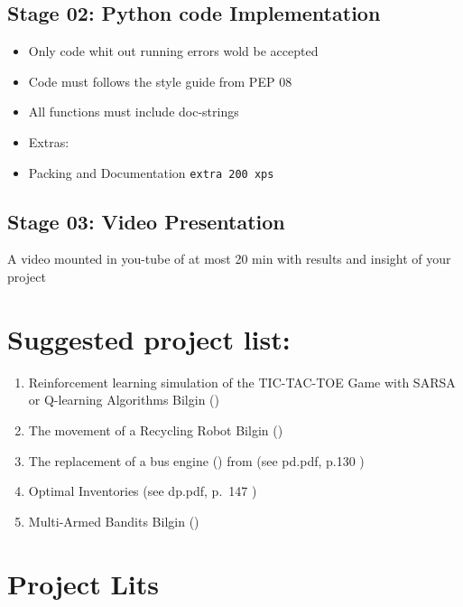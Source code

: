 \documentclass[
  letterpaper,
]{krantz}
\providecommand{\tightlist}{%
  \setlength{\itemsep}{0pt}\setlength{\parskip}{0pt}}\usepackage{longtable,booktabs,array}
\theoremstyle{plain}
\theoremstyle{definition}
\theoremstyle{definition}
\theoremstyle{remark}
\begin{document}
\subsection{Stage 02: Python code
Implementation}\label{stage-02-python-code-implementation}

\begin{itemize}
\tightlist
\item
  Only code whit out running errors wold be accepted
\item
  Code must follows the style guide from PEP 08
\item
  All functions must include doc-strings
\item
  Extras:
\item
  Packing and Documentation \texttt{extra\ 200\ xps}
\end{itemize}

\subsection{Stage 03: Video
Presentation}\label{stage-03-video-presentation}

A video mounted in you-tube of at most 20 min with results and insight
of your project

\section{Suggested project list:}\label{suggested-project-list}

\begin{enumerate}
\def\labelenumi{\arabic{enumi}.}
\tightlist
\item
  Reinforcement learning simulation of the TIC-TAC-TOE Game with SARSA
  or Q-learning Algorithms Bilgin ()
\item
  The movement of a Recycling Robot Bilgin
  ()
\item
  The replacement of a bus engine ()
  from (see pd.pdf, p.130 )
\item
  Optimal Inventories (see dp.pdf, p.~147
  )
\item
  Multi-Armed Bandits Bilgin ()
\end{enumerate}

\section{Project Lits}\label{project-lits}
\end{document}
